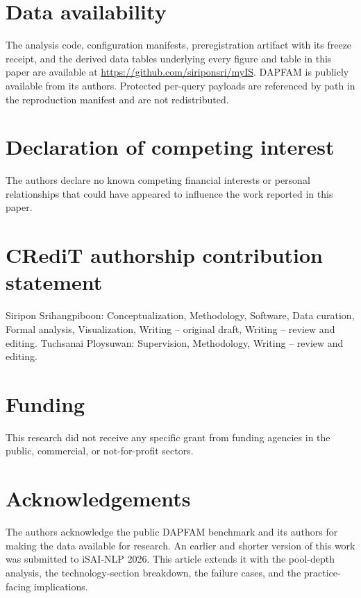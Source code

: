\documentclass[preprint,11pt,authoryear]{elsarticle}          %
\begin{document}
\section*{Data availability}
\label{sec:data}

The analysis code, configuration manifests, preregistration artifact with its freeze receipt, and the derived data tables underlying every figure and table in this paper are available at \url{https://github.com/siriponsri/myIS}. DAPFAM is publicly available from its authors. Protected per-query payloads are referenced by path in the reproduction manifest and are not redistributed.

\section*{Declaration of competing interest}

The authors declare no known competing financial interests or personal relationships that could have appeared to influence the work reported in this paper.

\section*{CRediT authorship contribution statement}

Siripon Srihangpiboon: Conceptualization, Methodology, Software, Data curation, Formal analysis, Visualization, Writing -- original draft, Writing -- review and editing. Tuchsanai Ploysuwan: Supervision, Methodology, Writing -- review and editing.

\section*{Funding}

This research did not receive any specific grant from funding agencies in the public, commercial, or not-for-profit sectors.

\section*{Acknowledgements}

The authors acknowledge the public DAPFAM benchmark and its authors for making the data available for research. An earlier and shorter version of this work was submitted to iSAI-NLP 2026. This
article extends it with the pool-depth analysis, the technology-section
breakdown, the failure cases, and the practice-facing implications.
\end{document}

